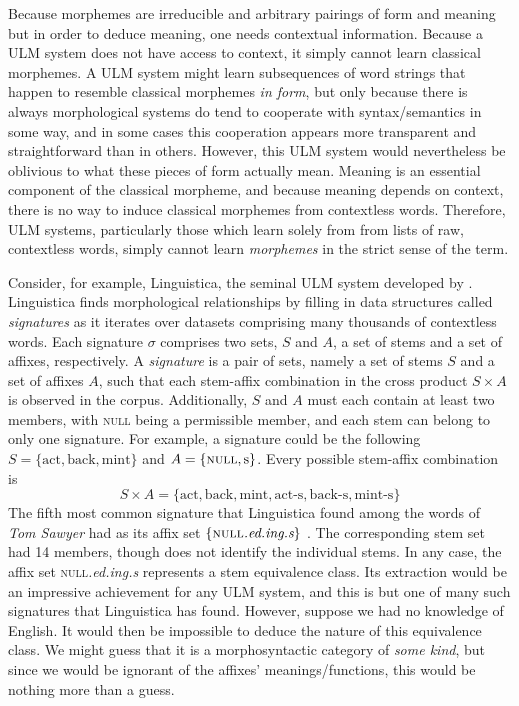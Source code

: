 Because morphemes are irreducible and arbitrary pairings of form and meaning
but in order to deduce meaning, one needs contextual information. Because
a \ac{ULM} system does not have access to context, it simply 
cannot learn classical morphemes. A \ac{ULM} system might learn 
subsequences of word strings that happen to resemble
 classical morphemes \emph{in form}, but only because there is always 
 morphological systems do tend to cooperate with syntax/semantics in some way, and in some 
 cases this cooperation appears more transparent and straightforward than
 in others.  However, this \ac{ULM} system would nevertheless be oblivious to what
 these pieces of form actually mean. Meaning is an essential component of the classical morpheme, and because
 meaning depends on context, there is no way to induce classical morphemes from contextless words.
Therefore, \ac{ULM} systems, particularly those which learn solely from 
from lists of raw, contextless words, simply cannot learn 
\emph{morphemes} in the strict sense of the term.

Consider, for example, Linguistica, the seminal 
\ac{ULM}  system developed by \cite{goldsmith:2001, goldsmith:2006}. 
Linguistica finds morphological relationships by filling in 
data structures 
called \emph{signatures} as it iterates over datasets comprising many
thousands of contextless words. Each signature $\sigma$ 
comprises 
two sets, $S$ and $A$, a set of stems and a set of affixes, 
respectively.
A \emph{signature} is a pair of sets, namely a set of stems $S$ and 
a set of affixes $A$, such that each stem-affix combination in the cross 
product $S \times A$ is observed in the corpus. Additionally, $S$ and 
$A$ must each contain at least two members, with \textsc{null} being 
a permissible member, and each stem can belong to only one signature.  
For example, a signature could be the following $S = \{ \text{act}, \text{back}, \text{mint} \}$ 
and $A = \{ \textsc{null}, \text{s}\}$. Every possible stem-affix combination is 
\begin{equation}
\label{eq:SxA}
S \times A = \{ \text{act}, \text{back}, \text{mint}, \text{act-s}, 
\text{back-s}, \text{mint-s}\}
\end{equation}
The fifth 
most common signature that Linguistica found among the words of 
\textit{Tom Sawyer} had as its affix set $\{\textsc{null}\textit{.ed.ing.s}\}$  \cite{goldsmith:2001}. 
The corresponding stem set had 14 members, though \cite{goldsmith:2001} 
does not identify the individual stems. 
In any case, the affix set \textsc{null}\textit{.ed.ing.s} represents 
a stem equivalence class. Its extraction would be an impressive achievement for any \ac{ULM}  system, and this
is but one of many such signatures that Linguistica has found. However, 
suppose we had no knowledge of English. It would then be impossible to deduce the nature 
of this equivalence class. We might
guess that it is a morphosyntactic category of \emph{some kind}, but since we would be ignorant
of the affixes' meanings/functions, this would be nothing more than a guess. 

